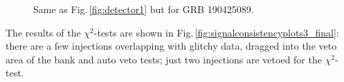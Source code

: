 \documentclass[binding=0.6cm, LaM]{sapthesis}
\begin{document}
\begin{figure}[!t]
          \centering
          \caption{Same as Fig.\,\ref{fig:detector1} but for GRB 190425089.}
          \label{fig:detector3}
        \end{figure}

 	The results of the $\chi^2$-tests are shown in Fig.\,\ref{fig:signalconsistencyplots3_final}:
       	there are a few injections overlapping with glitchy data, dragged into the veto  area of the bank and  auto veto tests;
	just two injections are vetoed for the $\chi^2$-test.
                \begin{figure}[!t]
                        \noindent
                        \label{signalconsistencyplots3_final}

\end{figure}
\end{document}
